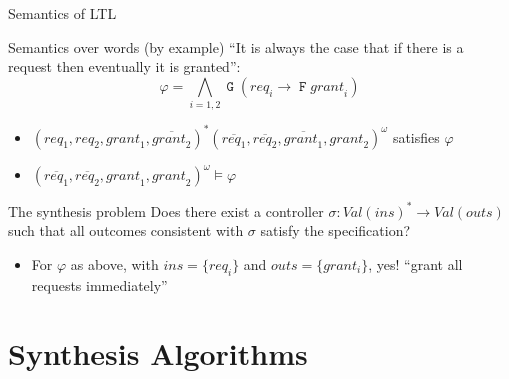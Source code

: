 \documentclass[aspectratio=169]{beamer}
\newcommand{\always}{\mathop{\mathtt{G}}}
\newcommand{\evtly}{\mathop{\mathtt{F}}}
\begin{document}
\begin{frame}{Semantics of LTL}
  \begin{block}{Semantics over words (by example)}
    ``It is always the case that if there is a request then eventually it is
    granted'':
    \[ \varphi = \bigwedge_{i=1,2} \always(\mathit{req}_i \rightarrow \evtly
    \mathit{grant}_i)\]
    \begin{itemize}
      \item
        $(\mathit{req}_1,\mathit{req}_2,\mathit{grant}_1,\overline{\mathit{grant}_2})^*
        (\overline{\mathit{req}_1},\overline{\mathit{req}_2},\overline{\mathit{grant}_1},\mathit{grant}_2)^\omega$
        \alert{satisfies} $\varphi$
        \pause
      \item
        $(\overline{\mathit{req}_1},\overline{\mathit{req}_2},\mathit{grant}_1,\mathit{grant}_2)^\omega
        \models \varphi$
    \end{itemize}
  \end{block}
  \pause
  \begin{block}{The synthesis problem}
    Does there exist a \alert{controller} $\sigma : Val(ins)^* \to Val(outs)$
    such that all outcomes consistent with $\sigma$ satisfy the specification?
    \pause
    \begin{itemize}
      \item For $\varphi$ as above, with $ins = \{req_i\}$ and $outs = \{grant_i\}$,
        \alert{yes!} ``grant all requests immediately''
    \end{itemize}
  \end{block}
\end{frame}

\section{Synthesis Algorithms}
\end{document}
